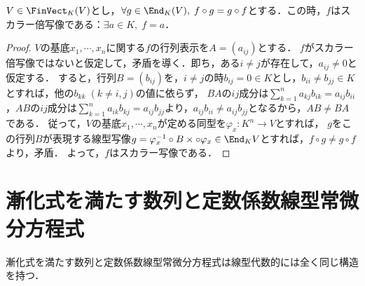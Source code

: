 \documentclass[uplatex, dvipdfmx]{jsreport}
\begin{document}
\begin{lemma}[スカラー倍写像の特徴付け]
    $V\in\FinVect_K(V)$とし，$\forall g\in\End_K(V),\;f\circ g=g\circ f$とする．この時，$f$はスカラー倍写像である：$\exists a\in K,\; f=a$．
\end{lemma}
\begin{proof}
    $V$の基底$x_1,\cdots,x_n$に関する$f$の行列表示を$A=(a_{ij})$とする．
    $f$がスカラー倍写像ではないと仮定して，矛盾を導く．即ち，ある$i\ne j$が存在して，$a_{ij}\ne 0$と仮定する．
    すると，行列$B=(b_{ij})$を，$i\ne j$の時$b_{ij}=0\in K$とし，$b_{ii}\ne b_{jj}\in K$とすれば，他の$b_{kk}\;(k\ne i,j)$の値に依らず，
    $BA$の$ij$成分は$\sum^n_{k=1}a_{kj}b_{ik}=a_{ij}b_{ii}$，$AB$の$ij$成分は$\sum^n_{k=1}a_{ik}b_{kj}=a_{ij}b_{jj}$より，$a_{ij}b_{ii}\ne a_{ij}b_{jj}$となるから，$AB\ne BA$である．
    従って，$V$の基底$x_1,\cdots,x_n$が定める同型を$\varphi_x:K^n\to V$とすれば，
    $g$をこの行列$B$が表現する線型写像$g=\varphi_x^{-1}\circ B\times\circ\varphi_x\in\End_K{V}$とすれば，$f\circ g\ne g\circ f$より，矛盾．
    よって，$f$はスカラー写像である．
\end{proof}

\section{漸化式を満たす数列と定数係数線型常微分方程式}

\begin{tcolorbox}[colframe=ForestGreen, colback=ForestGreen!10!white, breakable]
    漸化式を満たす数列と定数係数線型常微分方程式は線型代数的には全く同じ構造を持つ．
\end{tcolorbox}
\end{document}

